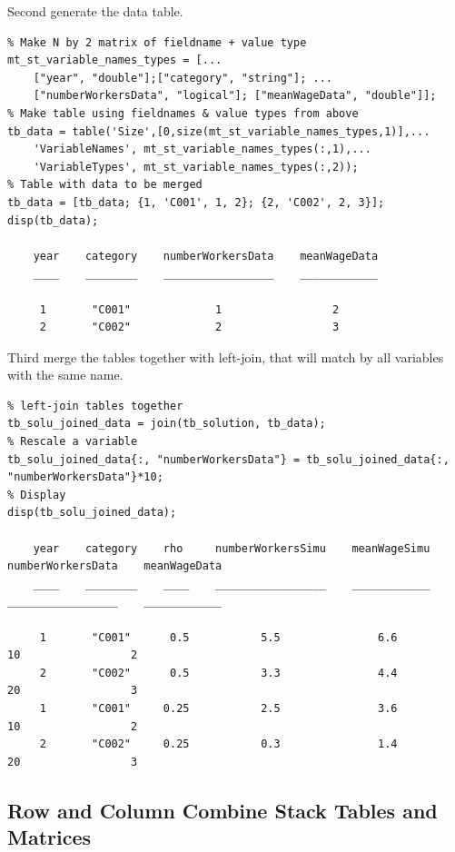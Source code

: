 \documentclass[
]{book}
\begin{document}
Second generate the data table.

\begin{verbatim}
% Make N by 2 matrix of fieldname + value type
mt_st_variable_names_types = [...
    ["year", "double"];["category", "string"]; ...
    ["numberWorkersData", "logical"]; ["meanWageData", "double"]];
% Make table using fieldnames & value types from above
tb_data = table('Size',[0,size(mt_st_variable_names_types,1)],... 
    'VariableNames', mt_st_variable_names_types(:,1),...
    'VariableTypes', mt_st_variable_names_types(:,2));
% Table with data to be merged
tb_data = [tb_data; {1, 'C001', 1, 2}; {2, 'C002', 2, 3}];
disp(tb_data);

    year    category    numberWorkersData    meanWageData
    ____    ________    _________________    ____________

     1       "C001"             1                 2      
     2       "C002"             2                 3      
\end{verbatim}

Third merge the tables together with left-join, that will match by all
variables with the same name.

\begin{verbatim}
% left-join tables together
tb_solu_joined_data = join(tb_solution, tb_data);
% Rescale a variable
tb_solu_joined_data{:, "numberWorkersData"} = tb_solu_joined_data{:, "numberWorkersData"}*10;
% Display
disp(tb_solu_joined_data);

    year    category    rho     numberWorkersSimu    meanWageSimu    numberWorkersData    meanWageData
    ____    ________    ____    _________________    ____________    _________________    ____________

     1       "C001"      0.5           5.5               6.6                10                 2      
     2       "C002"      0.5           3.3               4.4                20                 3      
     1       "C001"     0.25           2.5               3.6                10                 2      
     2       "C002"     0.25           0.3               1.4                20                 3      
\end{verbatim}

\hypertarget{row-and-column-combine-stack-tables-and-matrices}{%
\subsection{Row and Column Combine Stack Tables and Matrices}\label{row-and-column-combine-stack-tables-and-matrices}}
\end{document}
